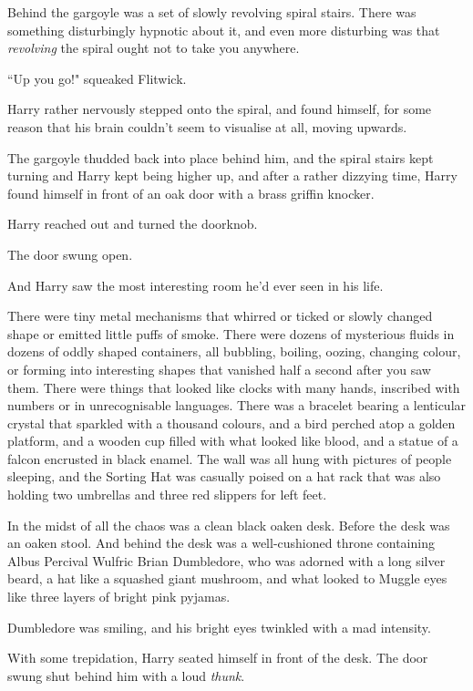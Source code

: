 Behind the gargoyle was a set of slowly revolving spiral stairs. There was something disturbingly hypnotic about it, and even more disturbing was that \emph{revolving} the spiral ought not to take you anywhere.

``Up you go!" squeaked Flitwick.

Harry rather nervously stepped onto the spiral, and found himself, for some reason that his brain couldn't seem to visualise at all, moving upwards.

The gargoyle thudded back into place behind him, and the spiral stairs kept turning and Harry kept being higher up, and after a rather dizzying time, Harry found himself in front of an oak door with a brass griffin knocker.

Harry reached out and turned the doorknob.

The door swung open.

And Harry saw the most interesting room he'd ever seen in his life.

There were tiny metal mechanisms that whirred or ticked or slowly changed shape or emitted little puffs of smoke. There were dozens of mysterious fluids in dozens of oddly shaped containers, all bubbling, boiling, oozing, changing colour, or forming into interesting shapes that vanished half a second after you saw them. There were things that looked like clocks with many hands, inscribed with numbers or in unrecognisable languages. There was a bracelet bearing a lenticular crystal that sparkled with a thousand colours, and a bird perched atop a golden platform, and a wooden cup filled with what looked like blood, and a statue of a falcon encrusted in black enamel. The wall was all hung with pictures of people sleeping, and the Sorting Hat was casually poised on a hat rack that was also holding two umbrellas and three red slippers for left feet.

In the midst of all the chaos was a clean black oaken desk. Before the desk was an oaken stool. And behind the desk was a well-cushioned throne containing Albus Percival Wulfric Brian Dumbledore, who was adorned with a long silver beard, a hat like a squashed giant mushroom, and what looked to Muggle eyes like three layers of bright pink pyjamas.

Dumbledore was smiling, and his bright eyes twinkled with a mad intensity.

With some trepidation, Harry seated himself in front of the desk. The door swung shut behind him with a loud \emph{thunk}.

